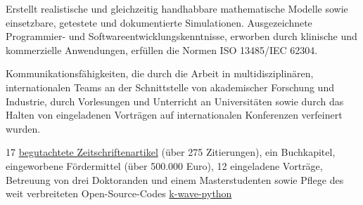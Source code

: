 \documentclass[german, print]{cv-style-wide-de}
\begin{document}
%
  \begin{NoHyphItemize}
    \item Erstellt realistische und gleichzeitig handhabbare mathematische Modelle sowie einsetzbare, getestete und dokumentierte Simulationen. Ausgezeichnete Programmier- und Softwareentwicklungskenntnisse, erworben durch klinische und kommerzielle Anwendungen, erfüllen die Normen ISO 13485/IEC 62304.%
\item Kommunikationsfähigkeiten, die durch die Arbeit in multidisziplinären, internationalen Teams an der Schnittstelle von akademischer Forschung und Industrie, durch Vorlesungen und Unterricht an Universitäten sowie durch das Halten von eingeladenen Vorträgen auf internationalen Konferenzen verfeinert wurden.
%    
%    
\item 17 \href{https://scholar.google.co.uk/citations?user=lauJqakAAAAJ&hl=en}{begutachtete Zeitschriftenartikel} (über 275 Zitierungen), ein Buchkapitel, eingeworbene Fördermittel (über 500.000 Euro), 12 eingeladene Vorträge, Betreuung von drei Doktoranden und einem Masterstudenten sowie Pflege des weit verbreiteten Open-Source-Codes \href{https://k-wave-python.readthedocs.io/en/latest/index.html#citation}{{k-wave-python}}
%
\end{NoHyphItemize}
\endgroup

\vspace{1\baselineskip}
  
\end{document}
